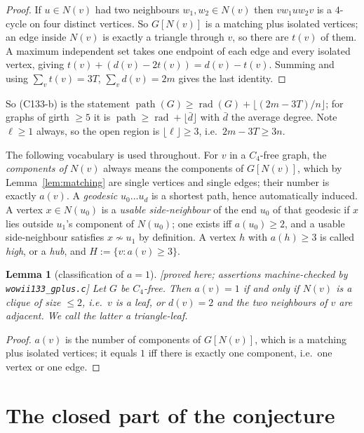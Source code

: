 \documentclass[11pt]{article}
\theoremstyle{plain}
\newtheorem{lemma}[theorem]{Lemma}
\theoremstyle{definition}
\theoremstyle{remark}
\numberwithin{equation}{section}
\newcommand{\rad}{\operatorname{rad}}
\newcommand{\pth}{\operatorname{path}}
\newcommand{\statusbox}[1]{{\small\sloppy\textsf{[#1]}}}
\newcommand{\PRV}[1]{\statusbox{proved here; assertions machine-checked by \texttt{#1}}}
\begin{document}
\begin{proof}
If $u \in N(v)$ had two neighbours $w_1, w_2 \in N(v)$ then $v w_1 u w_2 v$ is a $4$-cycle on
four distinct vertices. So $G[N(v)]$ is a matching plus isolated vertices; an edge inside
$N(v)$ is exactly a triangle through $v$, so there are $t(v)$ of them. A maximum independent
set takes one endpoint of each edge and every isolated vertex, giving
$t(v) + (d(v) - 2t(v)) = d(v)-t(v)$. Summing and using $\sum_v t(v) = 3T$, $\sum_v d(v) = 2m$
gives the last identity.
\end{proof}

So (C133-b) is the statement $\pth(G) \ge \rad(G) + \lfloor (2m-3T)/n \rfloor$; for graphs of
girth $\ge 5$ it is $\pth \ge \rad + \lfloor \bar d\rfloor$ with $\bar d$ the average degree.
Note $\ell \ge 1$ always, so the open region is $\lfloor \ell\rfloor \ge 3$, i.e.\
$2m - 3T \ge 3n$.

The following vocabulary is used throughout. For $v$ in a $C_4$-free graph, the
\emph{components of $N(v)$} always means the components of $G[N(v)]$, which by
Lemma~\ref{lem:matching} are single vertices and single edges; their number is exactly
$a(v)$. A \emph{geodesic} $u_0 \dots u_d$ is a shortest path, hence automatically induced. A
vertex $x \in N(u_0)$ is a \emph{usable side-neighbour} of the end $u_0$ of that geodesic if
$x$ lies outside $u_1$'s component of $N(u_0)$; one exists iff $a(u_0) \ge 2$, and a usable
side-neighbour satisfies $x \not\sim u_1$ by definition. A vertex $h$ with $a(h) \ge 3$ is
called \emph{high}, or a \emph{hub}, and $H := \{v : a(v) \ge 3\}$.

\begin{lemma}[classification of $a = 1$]\label{lem:g2}
\PRV{wowii133\_gplus.c}
Let $G$ be $C_4$-free. Then $a(v) = 1$ if and only if $N(v)$ is a clique of size $\le 2$,
i.e.\ $v$ is a leaf, or $d(v) = 2$ and the two neighbours of $v$ are adjacent. We call the
latter a \emph{triangle-leaf}.
\end{lemma}

\begin{proof}
$a(v)$ is the number of components of $G[N(v)]$, which is a matching plus isolated vertices;
it equals $1$ iff there is exactly one component, i.e.\ one vertex or one edge.
\end{proof}

\section{The closed part of the conjecture}\label{sec:closed}
\end{document}
